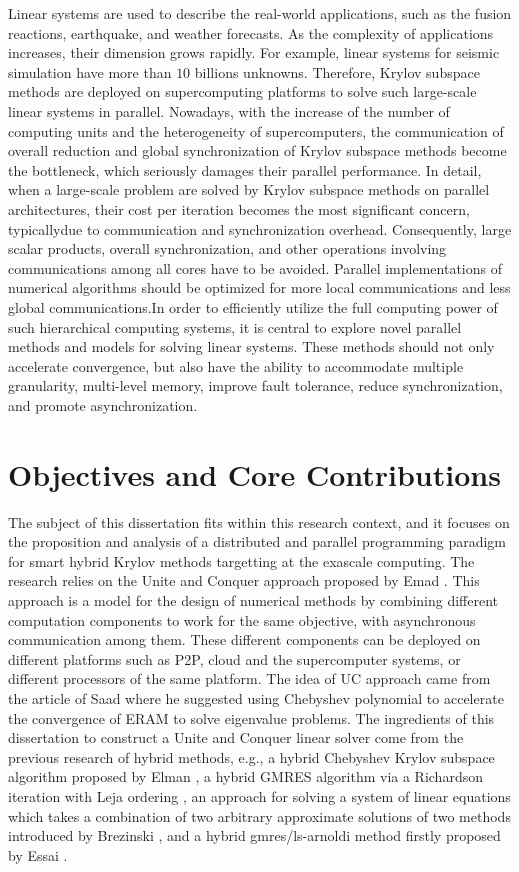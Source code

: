 Linear systems are used to describe the real-world applications, such as the fusion reactions, earthquake, and weather forecasts. As the complexity of applications increases, their dimension grows rapidly. For example, linear systems for seismic simulation have more than $10$ billions unknowns. Therefore, Krylov subspace methods are deployed on supercomputing platforms to solve such large-scale linear systems in parallel. Nowadays, with the increase of the number of computing units and the heterogeneity of supercomputers, the communication of overall reduction and global synchronization of Krylov subspace methods become the bottleneck, which seriously damages their parallel performance. In detail, when a large-scale problem are solved by Krylov subspace methods on parallel architectures, their cost per iteration becomes the most significant concern, typicallydue to communication and synchronization overhead. Consequently, large scalar products, overall synchronization, and other operations involving communications among all cores have to be avoided. Parallel implementations of numerical algorithms should be optimized for more local communications and less global communications.In order to efficiently utilize the full computing power of such hierarchical computing systems, it is central to explore novel parallel methods and models for solving linear systems. These methods should not only accelerate convergence, but also have the ability to accommodate multiple granularity, multi-level memory, improve fault tolerance, reduce synchronization, and promote asynchronization.

\section{Objectives and Core Contributions}

The subject of this dissertation fits within this research context, and it focuses on the proposition and analysis of a distributed and parallel programming paradigm for smart hybrid Krylov methods targetting at the exascale computing. The research relies on the Unite and Conquer approach proposed by Emad \cite{emad2016unite}. This approach is a model for the design of numerical methods by combining different computation components to work for the same objective, with asynchronous communication among them. These different components can be deployed on different platforms such as P2P, cloud and the supercomputer systems, or different processors of the same platform. The idea of UC approach came from the article of Saad \cite{saad1984chebyshev} where he suggested using Chebyshev polynomial to accelerate the convergence of ERAM to solve eigenvalue problems. The ingredients of this dissertation to construct a Unite and Conquer linear solver come from the previous research of hybrid methods, e.g., a hybrid Chebyshev Krylov subspace algorithm proposed by Elman \cite{elman1986hybrid}, a hybrid GMRES algorithm via a Richardson iteration with Leja ordering \cite{nachtigal1992hybrid}, an approach for solving a system of linear equations which takes a combination of two arbitrary approximate solutions of two methods introduced by Brezinski \cite{brezinski1994hybrid}, and a hybrid gmres/ls-arnoldi method firstly proposed by Essai \cite{essai1999heterogeneous}.


